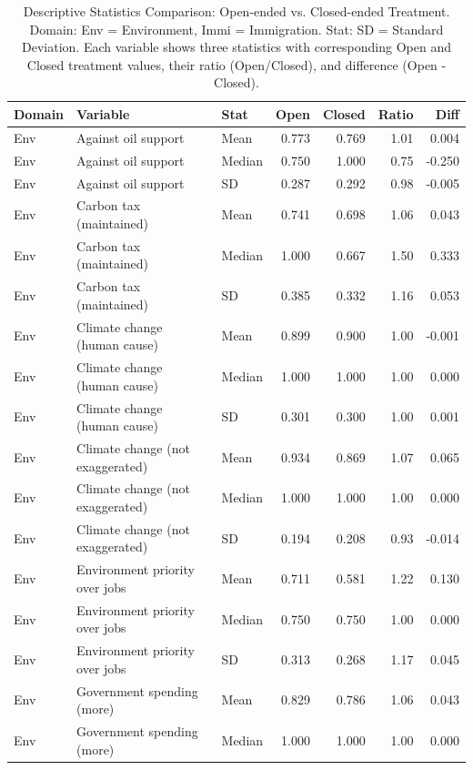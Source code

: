 \begin{table}[H]
\centering
\caption{Descriptive Statistics Comparison: Open-ended vs. Closed-ended Treatment. Domain: Env = Environment, Immi = Immigration. Stat: SD = Standard Deviation. Each variable shows three statistics with corresponding Open and Closed treatment values, their ratio (Open/Closed), and difference (Open - Closed).} 
\label{tab:descriptive_statistics}
\begingroup\small
\begin{tabular}{lllrrrr}
  \toprule
Domain & Variable & Stat & Open & Closed & Ratio & Diff \\ 
  \midrule
Env & Against oil support & Mean & 0.773 & 0.769 & 1.01 & 0.004 \\ 
  Env & Against oil support & Median & 0.750 & 1.000 & 0.75 & -0.250 \\ 
  Env & Against oil support & SD & 0.287 & 0.292 & 0.98 & -0.005 \\ 
  Env & Carbon tax (maintained) & Mean & 0.741 & 0.698 & 1.06 & 0.043 \\ 
  Env & Carbon tax (maintained) & Median & 1.000 & 0.667 & 1.50 & 0.333 \\ 
  Env & Carbon tax (maintained) & SD & 0.385 & 0.332 & 1.16 & 0.053 \\ 
  Env & Climate change (human cause) & Mean & 0.899 & 0.900 & 1.00 & -0.001 \\ 
  Env & Climate change (human cause) & Median & 1.000 & 1.000 & 1.00 & 0.000 \\ 
  Env & Climate change (human cause) & SD & 0.301 & 0.300 & 1.00 & 0.001 \\ 
  Env & Climate change (not exaggerated) & Mean & 0.934 & 0.869 & 1.07 & 0.065 \\ 
  Env & Climate change (not exaggerated) & Median & 1.000 & 1.000 & 1.00 & 0.000 \\ 
  Env & Climate change (not exaggerated) & SD & 0.194 & 0.208 & 0.93 & -0.014 \\ 
  Env & Environment priority over jobs & Mean & 0.711 & 0.581 & 1.22 & 0.130 \\ 
  Env & Environment priority over jobs & Median & 0.750 & 0.750 & 1.00 & 0.000 \\ 
  Env & Environment priority over jobs & SD & 0.313 & 0.268 & 1.17 & 0.045 \\ 
  Env & Government spending (more) & Mean & 0.829 & 0.786 & 1.06 & 0.043 \\ 
  Env & Government spending (more) & Median & 1.000 & 1.000 & 1.00 & 0.000 \\ 

\end{tabular}
\end{table}
